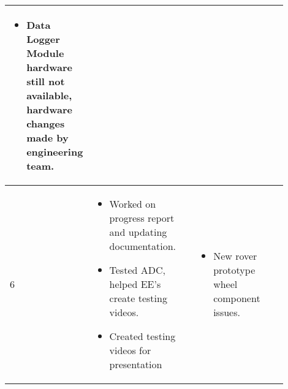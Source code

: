 \documentclass[onecolumn, draftclsnofoot,10pt, compsoc]{IEEEtran}
\newenvironment{myitemize}
{ \begin{itemize}
    \setlength{\itemsep}{0pt}
    \setlength{\parskip}{0pt}
    \setlength{\parsep}{0pt}     }
{ \end{itemize}                  }
\begin{document}
\begin{singlespacing}
\begin{tabular} {l p{0.45\linewidth} p{0.45\linewidth}}
\vspace{-\baselineskip}\begin{myitemize}
\item Data Logger Module hardware still not available, hardware changes made by engineering team.
\vspace{-\baselineskip}\end{myitemize} \\\hline
6 &
\vspace{-\baselineskip}\begin{myitemize}
\item Worked on progress report and updating documentation.
\item Tested ADC, helped EE's create testing videos.
\item Created testing videos for presentation
\vspace{-\baselineskip}\end{myitemize} & 
\vspace{-\baselineskip}\begin{myitemize}
\item New rover prototype wheel component issues.
\vspace{-\baselineskip}\end{myitemize} \\\hline

\end{tabular}
\end{singlespacing}
\newpage
\end{document}
